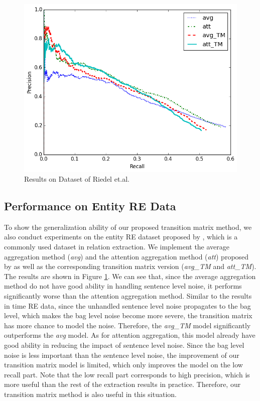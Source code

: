 \documentclass[11pt,a4paper]{article}
\begin{document}
\begin{figure}[htbp]
\includegraphics[width=0.9\linewidth]{re_att_avg_cmp_exp.png}
\caption{Results on Dataset of Riedel et.al.} 
\label{fig: Riedel_res}
\end{figure}

\subsection{Performance on Entity RE Data}
To show the generalization ability of our proposed transition matrix method, we also conduct experiments on the entity RE dataset proposed by \cite{riedel2010modeling}, which is a commonly used dataset in relation extraction. We implement the average aggregation method (\emph{avg}) and the attention aggregation method (\emph{att}) proposed by \cite{lin2016neural} as well as the corresponding transition matrix version (\emph{avg\_TM} and \emph{att\_TM}). The results are shown in Figure \ref{fig: Riedel_res}. We can see that, since the average aggregation method do not have good ability in handling sentence level noise, it performs significantly worse than the attention aggregation method. Similar to the results in time RE data, since the unhandled sentence level noise propagates to the bag level, which makes the bag level noise become more severe, the transition matrix has more chance to model the noise. Therefore, the \emph{avg\_TM} model significantly outperforms the \emph{avg} model. As for attention aggregation, this model already have good ability in reducing the impact of sentence level noise. Since the bag level noise is less important than the sentence level noise, the improvement of our transition matrix model is limited, which only improves the model on the low recall part. Note that the low recall part corresponds to high precision, which is more useful than the rest of the extraction results in practice. Therefore, our transition matrix method is also useful in this situation.
\end{document}
